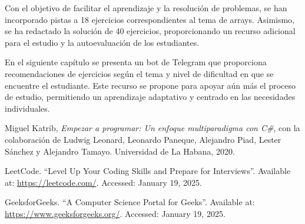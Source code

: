 \documentclass{article}
\begin{document}
Con el objetivo de facilitar el aprendizaje y la resolución de problemas, se han incorporado pistas a 18 ejercicios correspondientes al tema de arrays. Asimismo, se ha redactado la solución de 40 ejercicios, proporcionando un recurso adicional para el estudio y la autoevaluación de los estudiantes.

En el siguiente capítulo se presenta un bot de Telegram que proporciona recomendaciones de ejercicios según el tema y nivel de dificultad en que se encuentre el estudiante. Este recurso se propone para apoyar aún más el proceso de estudio, permitiendo un aprendizaje adaptativo y centrado en las necesidades individuales.

\begin{thebibliography}{99}
Miguel Katrib, \textit{Empezar a programar: Un enfoque multiparadigma con C\#}, con la colaboración de Ludwig Leonard, Leonardo Paneque, Alejandro Piad, Lester Sánchez y Alejandro Tamayo. Universidad de La Habana, 2020.

LeetCode. ``Level Up Your Coding Skills and Prepare for Interviews''. Available at: \url{https://leetcode.com/}. Accessed: January 19, 2025.

GeeksforGeeks. ``A Computer Science Portal for Geeks''. Available at: \url{https://www.geeksforgeeks.org/}. Accessed: January 19, 2025.
\end{thebibliography}
\end{document}
